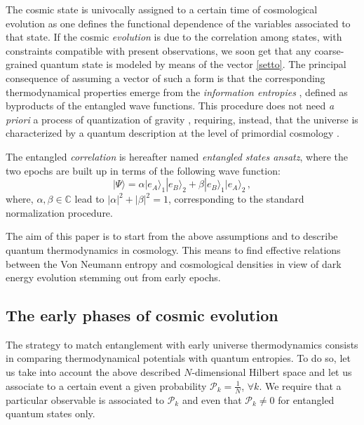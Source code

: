 \documentclass[nofootinbib,prd,superscriptaddress,showpacs,showkeys,]{revtex4}
\begin{document}
The cosmic state is univocally assigned to a certain time of cosmological evolution as one defines the functional dependence of the variables associated to that state. If the cosmic \emph{evolution} is due to the correlation among states, with constraints compatible with present observations, we soon get that any coarse-grained quantum state is modeled by means of  the vector  \eqref{setto}. The principal consequence of assuming a vector of such a form is that the corresponding thermodynamical properties emerge from the \emph{information entropies} \cite{nuew}, defined as byproducts of the  entangled wave functions. This procedure does not need \emph{a priori} a process of quantization of gravity
\cite{nicroro2,nicroro3}, requiring, instead, that the universe is characterized by a quantum description at the level of primordial cosmology \cite{queb}.

The entangled \emph{correlation} is hereafter named \emph{entangled states ansatz}, where the two epochs are built up in terms of the following wave function:
\begin{equation}
|\Psi\rangle = \alpha|e_A\rangle_1|e_B\rangle_2 + \beta|e_B\rangle_1|e_A\rangle_2\,,
\label{stato}
\end{equation}
where, $\alpha,\beta\in\mathbb{C}$ lead to $|\alpha|^2+|\beta|^2=1$, corresponding to the standard normalization procedure.

The aim of this paper is to start from the above assumptions and to describe  quantum thermodynamics in  cosmology. This means to find  effective relations between the Von Neumann entropy and cosmological densities in view   of  dark energy evolution stemming out from early epochs.




\subsection{The early phases of cosmic evolution}

The strategy to match entanglement with early universe thermodynamics consists in comparing thermodynamical potentials with quantum entropies. To do so, let us take into account the above described $N$-dimensional Hilbert space and let us associate to a certain event a given probability $\mathcal P_k = \frac{1}{N}$, $\forall k$. We require that a particular observable is associated to $\mathcal P_k$ and even that $\mathcal P_k\neq 0$ for entangled quantum states only.
\end{document}
